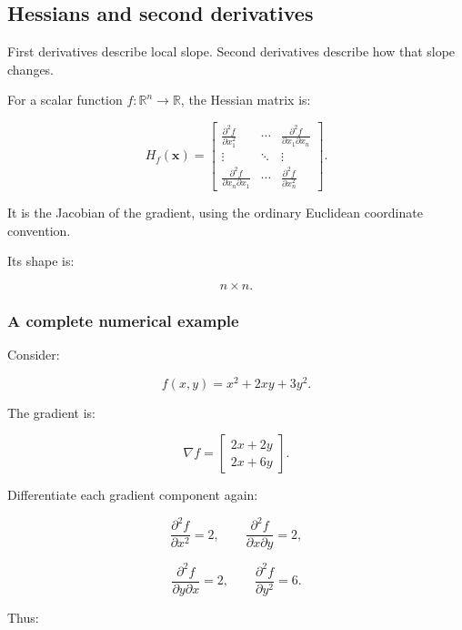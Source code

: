 \subsection{Hessians and second derivatives}\label{02-foundations-ii-ch021-hessians-and-second-derivatives}

\hypertarget{02-foundations-ii-ch021-hessians-and-second-derivatives}{}

First derivatives describe local slope. Second derivatives describe how that slope changes.

For a scalar function \(f:\mathbb R^n\to\mathbb R\), the Hessian matrix is:

\[
\boxed{ H_f(\mathbf x)= \begin{bmatrix} \frac{\partial^2f}{\partial x_1^2} & \cdots & \frac{\partial^2f}{\partial x_1\partial x_n} \\ \vdots&\ddots&\vdots\\ \frac{\partial^2f}{\partial x_n\partial x_1} & \cdots & \frac{\partial^2f}{\partial x_n^2} \end{bmatrix} }.
\]

It is the Jacobian of the gradient, using the ordinary Euclidean coordinate convention.

Its shape is:

\[
n\times n.
\]

\subsubsection{A complete numerical example}\label{02-foundations-ii-ch021-a-complete-numerical-example}

\hypertarget{02-foundations-ii-ch021-a-complete-numerical-example}{}

Consider:

\[
f(x,y)=x^2+2xy+3y^2.
\]

The gradient is:

\[
\nabla f= \begin{bmatrix} 2x+2y\\ 2x+6y \end{bmatrix}.
\]

Differentiate each gradient component again:

\[
\frac{\partial^2f}{\partial x^2}=2, \qquad \frac{\partial^2f}{\partial x\partial y}=2,
\]

\[
\frac{\partial^2f}{\partial y\partial x}=2, \qquad \frac{\partial^2f}{\partial y^2}=6.
\]

Thus:

